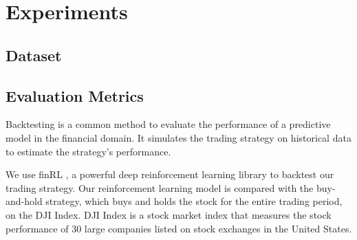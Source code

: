 \documentclass[conference]{IEEEtran}
\begin{document}

\section{Experiments}

\subsection{Dataset}


\subsection{Evaluation Metrics}

Backtesting is a common method to evaluate the performance of a predictive model in the financial domain.
It simulates the trading strategy on historical data to estimate the strategy's performance.

We use finRL \cite{liu2022finrldeepreinforcementlearning}, a powerful deep reinforcement learning library to backtest our trading strategy.
Our reinforcement learning model is compared with the buy-and-hold strategy, which buys and holds the stock for the entire trading period, on the DJI Index.
DJI Index is a stock market index that measures the stock performance of 30 large companies listed on stock exchanges in the United States.
\end{document}
